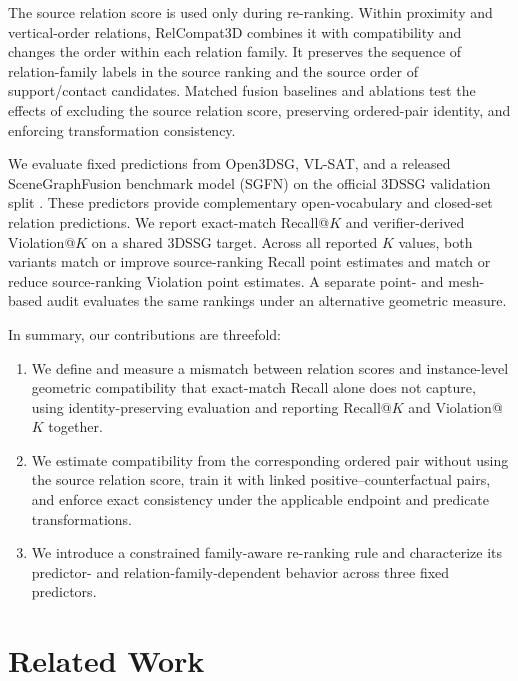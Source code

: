 The source relation score is used only during re-ranking. Within proximity and vertical-order relations, RelCompat3D combines it with compatibility and changes the order within each relation family. It preserves the sequence of relation-family labels in the source ranking and the source order of support/contact candidates. Matched fusion baselines and ablations test the effects of excluding the source relation score, preserving ordered-pair identity, and enforcing transformation consistency. 

We evaluate fixed predictions from Open3DSG, VL-SAT, and a released SceneGraphFusion benchmark model (SGFN) on the official 3DSSG validation split \cite{wang2023vl,koch2024open3dsg,wu2021scenegraphfusion}. These predictors provide complementary open-vocabulary and closed-set relation predictions. We report exact-match Recall@$K$ and verifier-derived Violation@$K$ on a shared 3DSSG target. Across all reported $K$ values, both variants match or improve source-ranking Recall point estimates and match or reduce source-ranking Violation point estimates. A separate point- and mesh-based audit evaluates the same rankings under an alternative geometric measure. 

In summary, our contributions are threefold:
\begin{enumerate}
    \item We define and measure a mismatch between relation scores and instance-level geometric compatibility that exact-match Recall alone does not capture, using identity-preserving evaluation and reporting Recall@$K$ and Violation@$K$ together. 
    \item We estimate compatibility from the corresponding ordered pair without using the source relation score, train it with linked positive--counterfactual pairs, and enforce exact consistency under the applicable endpoint and predicate transformations.
    \item We introduce a constrained family-aware re-ranking rule and characterize its predictor- and relation-family-dependent behavior across three fixed predictors.
\end{enumerate}


\section{Related Work}
